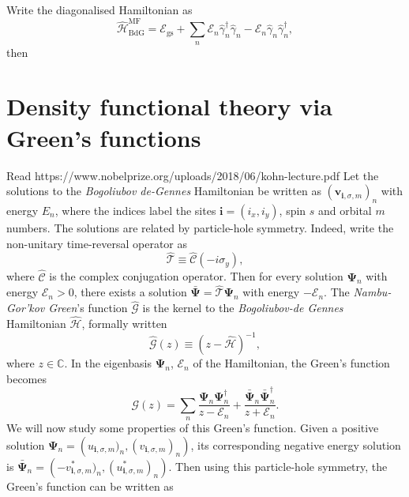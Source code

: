 Write the diagonalised Hamiltonian as
\begin{equation}
\hat{\mathcal{H}}_\text{BdG}^\text{MF}
=
\mathcal{E}_\text{gs}
+
\sum_{n}\mathcal{E}_n \hat\gamma_n^\dagger \hat\gamma_n-\mathcal{E}_n \hat\gamma_n \hat\gamma_n^\dagger,
\end{equation}
then

\section{Density functional theory via Green's functions}
\label{sec:general_DFT_Greens}
{\color{red} Read https://www.nobelprize.org/uploads/2018/06/kohn-lecture.pdf}
Let the solutions to the \textit{Bogoliubov de-Gennes} Hamiltonian be written as $(\bm{v}_{\mathbf{i}, \sigma, m})_n$ with energy $E_n$, where the indices label the sites $\mathbf{i}=(i_x,i_y)$, spin $s$ and orbital $m$ numbers. The solutions are related by particle-hole symmetry. Indeed, write the non-unitary time-reversal operator as
\begin{equation}
\hat{\mathcal{T}}\equiv \hat{\mathcal{C}}\left(-i\sigma_{y}\right),
\end{equation}
where $\hat{\mathcal{C}}$ is the complex conjugation operator. 
Then for every solution $\bm{\Psi}_n$ with energy $\mathcal{E}_n>0$, there exists a solution $\bar{\bm{\Psi}}=\hat{\mathcal{T}}\bm{\Psi}_n$ with energy $-\mathcal{E}_n$. 
The \textit{Nambu-Gor'kov Green}'s function $\hat{\bm{\mathcal{G}}}$ is the kernel to the \textit{Bogoliubov-de Gennes} Hamiltonian $\hat{\mathcal{H}}$, formally written
\begin{equation}
\hat{\bm{\mathcal{G}}}(z)\equiv\left(z-\hat{\mathcal{H}}\right)^{-1},
\end{equation}
where $z\in\mathbb{C}$.
In the eigenbasis $\bm{\Psi}_n$, $\mathcal{E}_n$ of the Hamiltonian, the Green's function becomes
\begin{equation}
\bm{\mathcal{G}}(z)=\sum_n\frac{\bm{\Psi}_n\bm{\Psi}_n^\dagger}{z-\mathcal{E}_n}+\frac{\bar{\bm{\Psi}}_n\bar{\bm{\Psi}}_n^\dagger}{z+\mathcal{E}_n}.
\end{equation}
We will now study some properties of this Green's function. Given a positive solution $\bm{\Psi}_n=\left(u_{\mathbf{i},\sigma,m})_n, (v_{\mathbf{i},\sigma,m})_n\right)$, its corresponding negative energy solution is $\bar{\bm{\Psi}}_n=\left(-v^*_{\mathbf{i},\sigma,m})_n, (u^*_{\mathbf{i},\sigma,m})_n\right)$.
Then using this particle-hole symmetry, the Green's function can be written as
